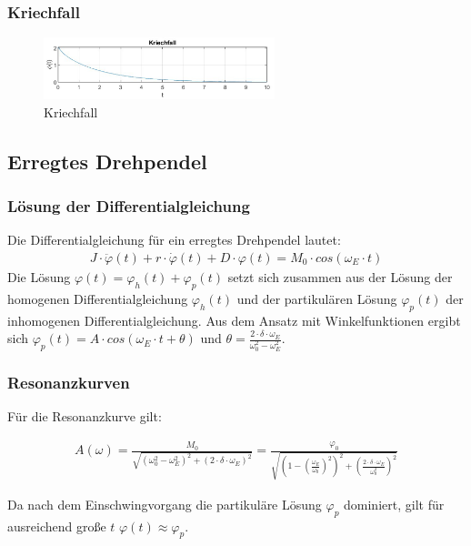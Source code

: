 \documentclass{article}
\begin{document}
\subsubsection{Kriechfall}

\begin{figure}[H]
    \centering
    \includegraphics[width=0.6\textwidth]{bilder/kriechfall.png}
    \caption{Kriechfall}
    \label{fig:kriech}
\end{figure}

\subsection{Erregtes Drehpendel}
\subsubsection{Lösung der Differentialgleichung}
Die Differentialgleichung für ein erregtes Drehpendel lautet:
\begin{gather} \label{eq:schwingung_partikulaere_loesung}
    J \cdot \ddot \varphi(t) + r \cdot \dot \varphi(t) + D \cdot \varphi(t) = M_0 \cdot cos(\omega_E \cdot t)
\end{gather}
Die Lösung $\varphi(t) = \varphi_h(t) + \varphi_p(t)$ setzt sich zusammen aus der Lösung der homogenen Differentialgleichung $\varphi_h(t)$ und der partikulären Lösung $\varphi_p(t)$ der inhomogenen
Differentialgleichung. Aus dem Ansatz mit Winkelfunktionen ergibt sich
$\varphi_p(t) = A \cdot cos(\omega_E \cdot t + \theta)$ und $\theta = \frac{2 \cdot \delta \cdot \omega_E}{\omega_0^2 - \omega_E^2}$.

\subsubsection{Resonanzkurven}
Für die Resonanzkurve gilt:

\begin{gather} \label{eq:resonanzkurve}
    A(\omega) = \frac{M_0}{\sqrt{(\omega_0^2 - \omega_E^2)^2 + (2 \cdot \delta \cdot \omega_E)^2}}
    = \frac{\varphi_0}{\sqrt{(1 - (\frac{\omega_E}{\omega_0})^2)^2 + (\frac{2 \cdot \delta \cdot \omega_E}{\omega_0^2})^2}}
\end{gather}

Da nach dem Einschwingvorgang die partikuläre Lösung $\varphi_p$ dominiert, gilt für ausreichend große $t$ $\varphi(t) \approx \varphi_p$.
\end{document}
